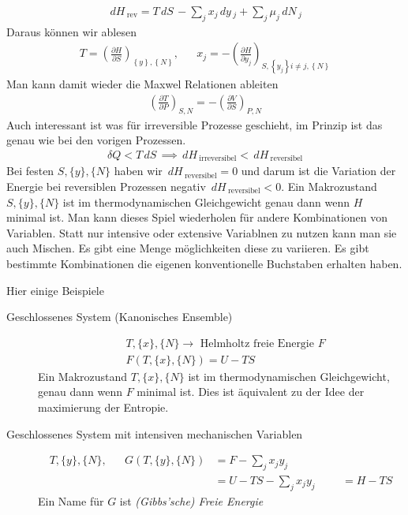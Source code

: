 \documentclass[11pt]{article}
\theoremstyle{plain}
\theoremstyle{mytheoremstyle}
\newcommand{\pd}[2]{\frac{\partial #1 }{\partial #2}}
\renewcommand{\d}[1]{\,d#1\,}
\begin{document}
\begin{description}
\begin{align*}
      \d{H}_{\text{rev}} = T \d{S} - \sum_{j}^{} x_j \d{y}_j + \sum_{j}^{}
      \mu_j \d{N}_j
    \end{align*}
    Daraus können wir ablesen
    \begin{align*}
      T = \left( \pd{H}{S} \right)_{ \left\{ y \right\}, \left\{ N \right\} }, &&
      x_j = - \left( \pd{H}{y_j} \right)_{ S, \left\{ y_j \right\} i\neq j, \left\{ N \right\} }
    \end{align*}
    Man kann damit wieder die Maxwel Relationen ableiten
    \begin{align*}
      \left( \pd{T}{P} \right)_{S, N} = - \left( \pd{V}{S} \right)_{P, N}
    \end{align*}
    Auch interessant ist was für irreversible Prozesse geschieht, im Prinzip
    ist das genau wie bei den vorigen Prozessen.
    \begin{align*}
      \delta Q < T \d{S} \implies \d{H}_{\text{irreversibel}} < \d{H}_{\text{reversibel}}
    \end{align*}
    Bei festen $S, \{y\}, \{N\}$ haben wir $ \d{H}_{\text{reversibel}} = 0$
    und darum ist die Variation der Energie bei reversiblen Prozessen negativ
    $ \d{H}_{\text{reversibel}} < 0$. 
    Ein Makrozustand $S, \{y\}, \{N\}$ ist im thermodynamischen Gleichgewicht
    genau dann wenn $H$ minimal ist.
    Man kann dieses Spiel wiederholen für andere Kombinationen von Variablen.
    Statt nur intensive oder extensive Variablnen zu nutzen kann man sie auch Mischen.
    Es gibt eine Menge möglichkeiten diese zu variieren. Es gibt bestimmte
    Kombinationen die eigenen konventionelle Buchstaben erhalten haben. 
\end{description}

Hier einige Beispiele
\begin{description}
  \item[Geschlossenes System (Kanonisches Ensemble)] 
    \begin{align*}
      & T, \{x\}, \{N\} \to \text{ Helmholtz freie Energie } F \\
      & F(T, \{x\}, \{N\}) = U - TS
    \end{align*}
    Ein Makrozustand $T, \{x\}, \{N\}$ ist im thermodynamischen Gleichgewicht, genau
    dann wenn $F$ minimal ist. Dies ist äquivalent zu der Idee der maximierung
    der Entropie.
  \item[Geschlossenes System mit intensiven mechanischen Variablen]
    \begin{align*}
      T, \{y\}, \{N\}, && G(T, \{y\}, \{N\}) & = F - \sum_{j}^{}x_j y_j \\
                       && & =  U - TS - \sum_{j}^{} x_j y_j
                       && & = H - TS
    \end{align*}
    Ein Name für $G$ ist \emph{(Gibbs'sche) Freie Energie}
\end{description}
\end{document}
